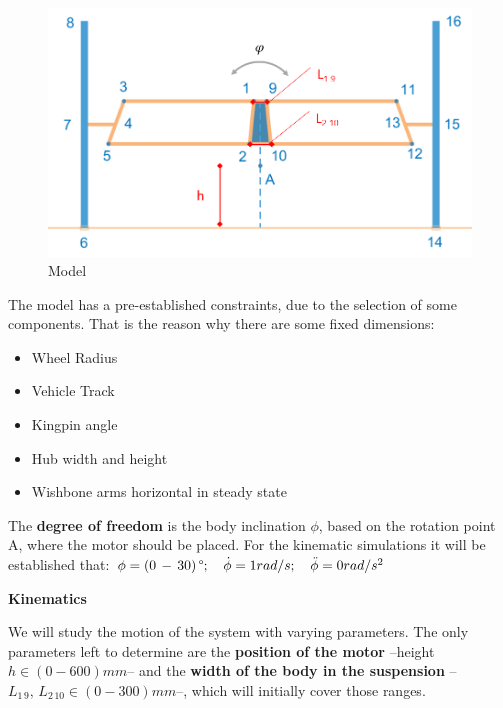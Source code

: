 \begin{figure}
	\includegraphics[width=1.0\linewidth]{figs/05/sim/Picture2}
	\caption{Model}
\end{figure}
The model has a pre-established constraints, due to the selection of some components. That is the reason why there are some fixed dimensions:
\begin{itemize}
\begin{itemize} \itemsep -15pt
 \item Wheel Radius
 \item Vehicle Track
 \item Kingpin angle
 \item Hub width and height
 \item Wishbone arms horizontal in steady state
\end{itemize}
\end{itemize}
The \textbf{degree of freedom} is the body inclination $\phi$, based on the rotation point A, where the motor should be placed. For the kinematic simulations it will be established that: $\phi=(0\,-\,30)\,\degree;\quad \dot{\phi}=1 rad/s;\quad \ddot{\phi}=0 rad/s^{2}$

\textbf{Kinematics}

We will study the motion of the system with varying parameters. The only parameters left to determine are the \textbf{position of the motor} --height $h \in (0-600) mm$-- and the \textbf{width of the body in the suspension} --$L_{1\,9},\,L_{2\,10} \in (0-300) mm$--, which will initially cover those ranges.

